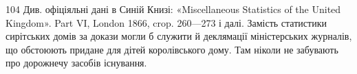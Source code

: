 104    Див. офіціяльні дані в Синій Книзі: «Miscellaneous Statistics
of the United Kingdom». Part VI, London 1866, crop. 260—273 і далі.
Замість статистики сирітських домів за докази могли б служити й деклямації
міністерських журналів, що обстоюють придане для дітей королівського
дому. Там ніколи не забувають про дорожнечу засобів існування.
